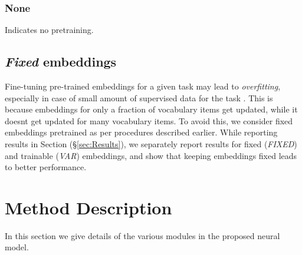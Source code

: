 \subsubsection{None}
Indicates no pretraining.



\subsection{\emph{Fixed} embeddings}
Fine-tuning pre-trained embeddings for a given task may lead to \emph{overfitting}, especially in case of small amount of supervised data for the task \cite{madhyastha2015mapping}. This is because embeddings for only a fraction of vocabulary items get updated,  while it doesnt get updated for many vocabulary items. To avoid this, we consider fixed embeddings pretrained as per procedures described earlier. While reporting  results  in Section (\S \ref{sec:Results}), we separately report results for fixed (\emph{FIXED}) and trainable (\emph{VAR}) embeddings, and show that keeping embeddings fixed leads to better performance. 

\section{Method Description} \label{sec:Method3}
In this section we give details of the various modules in the proposed neural model. 

